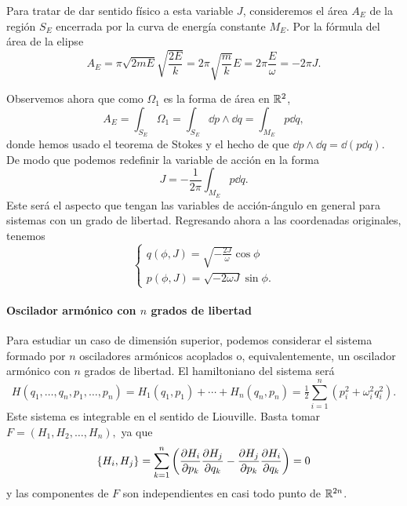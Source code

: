   Para tratar de dar sentido físico a esta variable $J$, consideremos el área $A_E$ de la región $S_E$ encerrada por la curva de energía constante $M_E$. Por la fórmula del área de la elipse
  \begin{equation*}
    A_E=\pi \sqrt{2mE} \sqrt{\frac{2E}{k}}=2\pi \sqrt{\frac{m}{k}} E= 2 \pi \frac{E}{\omega}= -2\pi J.
  \end{equation*}

  Observemos ahora que como $\Omega_1$ es la forma de área en $\mathbb{R}^2$, 
  \begin{equation*}
    A_E=\int_{S_E}\Omega_1 = \int_{S_E} \dd p \wedge \dd q = \int_{M_E}p\dd q,
\end{equation*}
donde hemos usado el teorema de Stokes y el hecho de que $\dd p \wedge \dd q= \dd(p\dd q)$. De modo que podemos redefinir la variable de acción en la forma
\begin{equation*}
  J=-\frac{1}{2\pi}\int_{M_E}p \dd q.
\end{equation*}
Este será el aspecto que tengan las variables de acción-ángulo en general para sistemas con un grado de libertad. Regresando ahora a las coordenadas originales, tenemos
\begin{equation*}
  \begin{cases}
    q(\phi,J)=\sqrt{-\frac{2J}{ \omega}}\cos \phi\\
    p(\phi,J)=\sqrt{-2\omega J}\sin \phi.
  \end{cases}
\end{equation*}

\paragraph{\bf Oscilador armónico con $n$ grados de libertad}\mbox{}

  Para estudiar un caso de dimensión superior, podemos considerar el sistema formado por $n$ osciladores armónicos acoplados o, equivalentemente, un oscilador armónico con $n$ grados de libertad. El hamiltoniano del sistema será 
  \begin{equation*}
    H(q_1,\dots,q_n,p_1,\dots,p_n)= H_1(q_1,p_1)+ \cdots +H_n(q_n,p_n) = \tfrac{1}{2}\sum_{i=1}^n (p_i^2+\omega_i^2q_i^2).
  \end{equation*}
  Este sistema es integrable en el sentido de Liouville. Basta tomar $F=(H_1,H_2,\dots,H_n),$ ya que 
  \begin{equation*}
    \left\lbrace H_i,H_j\right\rbrace = \sum_{k=1}^n\left( \frac{\partial H_i}{\partial p_k}\frac{\partial H_j}{\partial q_k} - \frac{\partial H_j}{\partial p_k}\frac{\partial H_i}{\partial q_k}\right)=0
  \end{equation*}
  y las componentes de $F$ son independientes en casi todo punto de $\mathbb{R}^{2n}$. 
  
